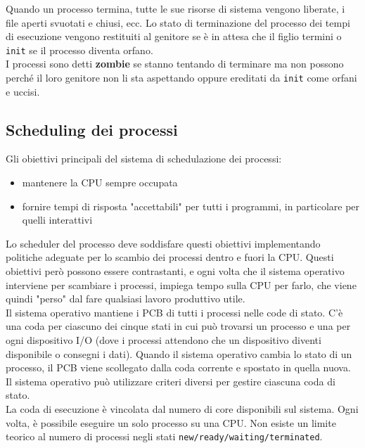 \documentclass{article}
\begin{document}
Quando un processo termina, tutte le sue risorse di sistema vengono liberate, i file aperti svuotati e chiusi, ecc. Lo stato di terminazione del processo dei tempi di esecuzione vengono restituiti al genitore se è in attesa che il figlio termini o \texttt{init} se il processo diventa orfano. \\

I processi sono detti \textbf{zombie} se stanno tentando di terminare ma non possono perché il loro genitore non li sta aspettando oppure ereditati da \texttt{init} come orfani e uccisi.

\subsection{Scheduling dei processi}

Gli obiettivi principali del sistema di schedulazione dei processi:
\begin{itemize} 
    \item mantenere la CPU sempre occupata
    \item fornire tempi di risposta "accettabili" per tutti i programmi, in particolare per quelli interattivi
\end{itemize}
Lo scheduler del processo deve soddisfare questi obiettivi implementando politiche adeguate per lo scambio dei processi dentro e fuori la CPU. Questi obiettivi però possono essere contrastanti, e ogni volta che il sistema operativo interviene per scambiare i processi, impiega tempo sulla CPU per farlo, che viene quindi "perso" dal fare qualsiasi lavoro produttivo utile.\\

Il sistema operativo mantiene i PCB di tutti i processi nelle code di stato. C'è una coda per ciascuno dei cinque stati in cui può trovarsi un processo e una per ogni dispositivo I/O (dove i processi attendono che un dispositivo diventi disponibile o consegni i dati). Quando il sistema operativo cambia lo stato di un processo, il PCB viene scollegato dalla coda corrente e spostato in quella nuova. Il sistema operativo può utilizzare criteri diversi per gestire ciascuna coda di stato. \\

La coda di esecuzione è vincolata dal numero di core disponibili sul sistema. Ogni volta, è possibile eseguire un solo processo su una CPU. Non esiste un limite teorico al numero di processi negli stati \texttt{new/ready/waiting/terminated}.\\
\end{document}
